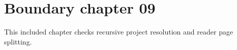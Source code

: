 \section{Boundary chapter 09}
\label{sec:boundary-09}
This included chapter checks recursive project resolution and reader page splitting.
